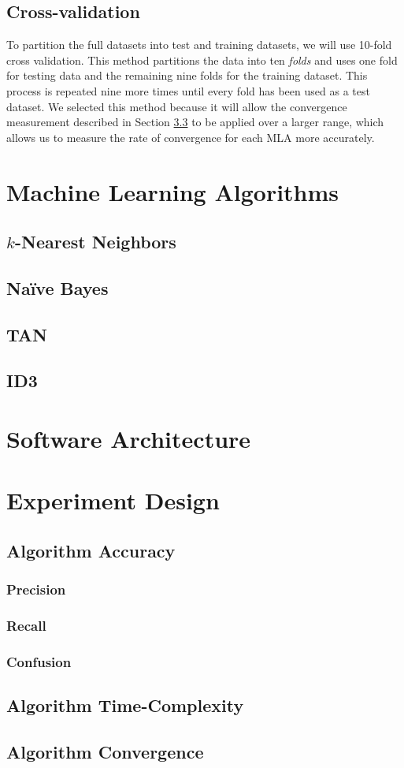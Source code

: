\documentclass{article}
\begin{document}
		\subsection{Cross-validation}
			To partition the full datasets into test and training datasets, we will use 10-fold cross validation. 
			This method partitions the data into ten \textit{folds} and uses one fold for testing data and the remaining nine folds for the training dataset. 
			This process is repeated nine more times until every fold has been used as a test dataset. 
			We selected this method because it will allow the convergence measurement described in Section \ref{convergence} to be applied over a larger range, which allows us to measure the rate of convergence for each MLA more accurately.
	\section{Machine Learning Algorithms}
		\subsection{$k$-Nearest Neighbors}
		\subsection{Na\"ive Bayes}
		\subsection{TAN}
		\subsection{ID3}
	\section{Software Architecture}
	\section{Experiment Design}
		\subsection{Algorithm Accuracy}
			\subsubsection{Precision}
			\subsubsection{Recall}
			\subsubsection{Confusion}
		\subsection{Algorithm Time-Complexity}
		\subsection{Algorithm Convergence}
			\label{convergence}

		
	
\end{document}
